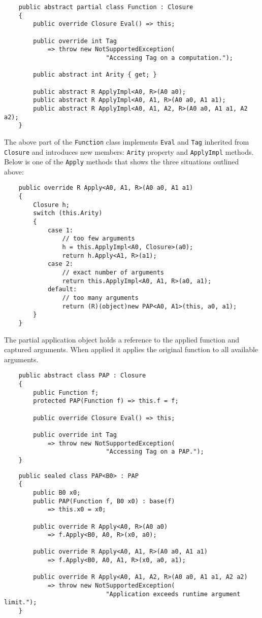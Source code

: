 \documentclass[en]{pracamgr}
\begin{document}
\begin{verbatim}
    public abstract partial class Function : Closure
    {
        public override Closure Eval() => this;

        public override int Tag
            => throw new NotSupportedException(
                            "Accessing Tag on a computation.");
        
        public abstract int Arity { get; }
            
        public abstract R ApplyImpl<A0, R>(A0 a0);
        public abstract R ApplyImpl<A0, A1, R>(A0 a0, A1 a1);
        public abstract R ApplyImpl<A0, A1, A2, R>(A0 a0, A1 a1, A2 a2);
    }
\end{verbatim}

The above part of the \texttt{Function} class implements \texttt{Eval}
and \texttt{Tag} inherited from \texttt{Closure} and introduces
new members: \texttt{Arity} property and \texttt{ApplyImpl} methods.
Below is one of the \texttt{Apply} methods that shows the three situations outlined above:

\begin{verbatim}
    public override R Apply<A0, A1, R>(A0 a0, A1 a1)
    {
        Closure h;
        switch (this.Arity)
        {
            case 1:
                // too few arguments
                h = this.ApplyImpl<A0, Closure>(a0);
                return h.Apply<A1, R>(a1);
            case 2:
                // exact number of arguments
                return this.ApplyImpl<A0, A1, R>(a0, a1);
            default:
                // too many arguments
                return (R)(object)new PAP<A0, A1>(this, a0, a1);
        }
    }
\end{verbatim}

The partial application object holds a reference to the
applied function and captured arguments.
When applied it applies the original function to all available arguments.

\begin{verbatim}
    public abstract class PAP : Closure
    {
        public Function f;
        protected PAP(Function f) => this.f = f;

        public override Closure Eval() => this;

        public override int Tag
            => throw new NotSupportedException(
                            "Accessing Tag on a PAP.");
    }
\end{verbatim}
\begin{verbatim}
    public sealed class PAP<B0> : PAP
    {
        public B0 x0;
        public PAP(Function f, B0 x0) : base(f)
            => this.x0 = x0;

        public override R Apply<A0, R>(A0 a0)
            => f.Apply<B0, A0, R>(x0, a0);
        
        public override R Apply<A0, A1, R>(A0 a0, A1 a1) 
            => f.Apply<B0, A0, A1, R>(x0, a0, a1);
        
        public override R Apply<A0, A1, A2, R>(A0 a0, A1 a1, A2 a2)
            => throw new NotSupportedException(
                            "Application exceeds runtime argument limit.");
    }
\end{verbatim}
\end{document}
